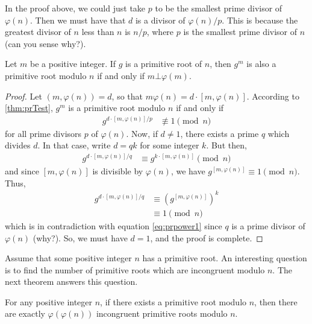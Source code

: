 \documentclass{subfile}
\begin{document}
	\begin{note}
		In the proof above, we could just take $p$ to be the smallest prime divisor of $\varphi(n)$. Then we must have that $d$ is a divisor of ${\varphi(n)}/{p}$. This is because the greatest divisor of $n$ less than $n$ is ${n}/{p}$, where $p$ is the smallest prime divisor of $n$ (can you sense why?).
	\end{note}

	\begin{corollary}\label{cor:prpower}
		Let $m$ be a positive integer. If $g$ is a primitive root of $n$, then $g^m$ is also a primitive root modulo $n$ if and only if $m \bot \varphi(m)$.
	\end{corollary}

	\begin{proof}
		Let $(m,\varphi(n))=d$, so that $m\varphi(n)=d\cdot [m,\varphi(n)]$. According to \autoref{thm:prTest}, $g^m$ is a primitive root modulo $n$ if and only if
			\begin{align}\label{eq:prpower1}
				g^{{d\cdot [m,\varphi(n)]}/{p}}
					& \not\equiv1\pmod n
			\end{align}
		for all prime divisors $p$ of $\varphi(n)$. Now, if $d \neq 1$, there exists a prime $q$ which divides $d$. In that case, write $d=qk$ for some integer $k$. But then,
			\begin{align*}
				g^{{d\cdot [m,\varphi(n)]}/{q}}
					& \equiv g^{k \cdot [m,\varphi(n)]}\pmod n
			\end{align*}
		and since $[m,\varphi(n)]$ is divisible by $\varphi(n)$, we have $g^{ [m,\varphi(n)]} \equiv 1\pmod n$. Thus,
			\begin{align*}
				g^{{d\cdot [m,\varphi(n)]}/{q}}
					& \equiv \left(g^{[m,\varphi(n)]}\right)^k\\
					& \equiv 1\pmod n
			\end{align*}
		which is in contradiction with equation \eqref{eq:prpower1} since $q$ is a prime divisor of $\varphi(n)$ (why?). So, we must have $d=1$, and the proof is complete.
	\end{proof}

Assume that some positive integer $n$ has a primitive root. An interesting question is to find the number of primitive roots which are incongruent modulo $n$. The next theorem answers this question.

	\begin{theorem}\label{thm:npr}
		For any positive integer $n$, if there exists a primitive root modulo $n$, then there are exactly $\varphi(\varphi(n))$ incongruent primitive roots modulo $n$.
	\end{theorem}
\end{document}
